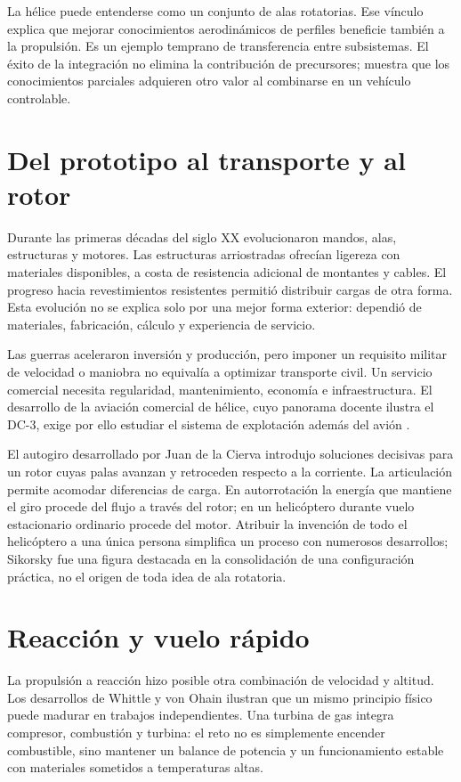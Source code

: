 La hélice puede entenderse como un conjunto de alas rotatorias. Ese vínculo explica que mejorar conocimientos aerodinámicos de perfiles beneficie también a la propulsión. Es un ejemplo temprano de transferencia entre subsistemas. El éxito de la integración no elimina la contribución de precursores; muestra que los conocimientos parciales adquieren otro valor al combinarse en un vehículo controlable.

\section{Del prototipo al transporte y al rotor}
Durante las primeras décadas del siglo XX evolucionaron mandos, alas, estructuras y motores. Las estructuras arriostradas ofrecían ligereza con materiales disponibles, a costa de resistencia adicional de montantes y cables. El progreso hacia revestimientos resistentes permitió distribuir cargas de otra forma. Esta evolución no se explica solo por una mejor forma exterior: dependió de materiales, fabricación, cálculo y experiencia de servicio.

Las guerras aceleraron inversión y producción, pero imponer un requisito militar de velocidad o maniobra no equivalía a optimizar transporte civil. Un servicio comercial necesita regularidad, mantenimiento, economía e infraestructura. El desarrollo de la aviación comercial de hélice, cuyo panorama docente ilustra el DC-3, exige por ello estudiar el sistema de explotación además del avión \cite{TAE1}.

El autogiro desarrollado por Juan de la Cierva introdujo soluciones decisivas para un rotor cuyas palas avanzan y retroceden respecto a la corriente. La articulación permite acomodar diferencias de carga. En autorrotación la energía que mantiene el giro procede del flujo a través del rotor; en un helicóptero durante vuelo estacionario ordinario procede del motor. Atribuir la invención de todo el helicóptero a una única persona simplifica un proceso con numerosos desarrollos; Sikorsky fue una figura destacada en la consolidación de una configuración práctica, no el origen de toda idea de ala rotatoria.

\section{Reacción y vuelo rápido}
La propulsión a reacción hizo posible otra combinación de velocidad y altitud. Los desarrollos de Whittle y von Ohain ilustran que un mismo principio físico puede madurar en trabajos independientes. Una turbina de gas integra compresor, combustión y turbina: el reto no es simplemente encender combustible, sino mantener un balance de potencia y un funcionamiento estable con materiales sometidos a temperaturas altas.

